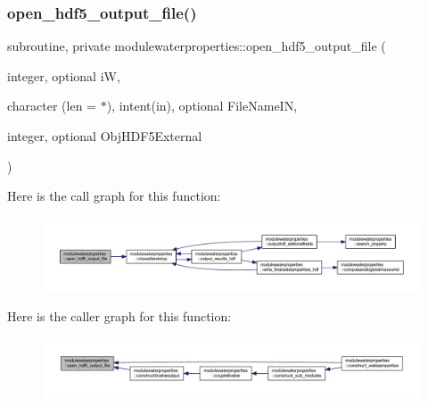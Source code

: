 \subsubsection{\texorpdfstring{open\+\_\+hdf5\+\_\+output\+\_\+file()}{open\_hdf5\_output\_file()}}
{\footnotesize\ttfamily subroutine, private modulewaterproperties\+::open\+\_\+hdf5\+\_\+output\+\_\+file (\begin{DoxyParamCaption}\item[{integer, optional}]{iW,  }\item[{character (len = $\ast$), intent(in), optional}]{File\+Name\+IN,  }\item[{integer, optional}]{Obj\+H\+D\+F5\+External }\end{DoxyParamCaption})\hspace{0.3cm}{\ttfamily [private]}}

Here is the call graph for this function\+:\nopagebreak
\begin{figure}[H]
\begin{center}
\leavevmode
\includegraphics[width=350pt]{namespacemodulewaterproperties_a20976aef3db724e8f1b9ec39453b5a98_cgraph}
\end{center}
\end{figure}
Here is the caller graph for this function\+:\nopagebreak
\begin{figure}[H]
\begin{center}
\leavevmode
\includegraphics[width=350pt]{namespacemodulewaterproperties_a20976aef3db724e8f1b9ec39453b5a98_icgraph}
\end{center}
\end{figure}
\mbox{\label{namespacemodulewaterproperties_a947e6ba82bfc1266159800996b8e073c}} 
